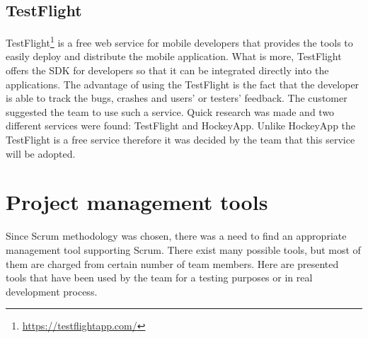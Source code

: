 \subsection{TestFlight}
\label{subsec:testflight}
TestFlight\footnote{\url{https://testflightapp.com/}} is a free web service for mobile developers that provides the tools to easily deploy and distribute the mobile application. 
What is more, TestFlight offers the SDK for developers so that it can be integrated directly into the applications. 
The advantage of using the TestFlight is the fact that the developer is able to track the bugs, crashes and users' or testers' feedback. 
The customer suggested the team to use such a service.
Quick research was made and two different services were found: TestFlight and HockeyApp. Unlike HockeyApp the TestFlight is a free service therefore it was decided by the team that this service will be adopted.


\section{Project management tools}
\label{sec:management_tools}
Since Scrum methodology was chosen, there was a need to find an appropriate management tool supporting Scrum.
There exist many possible tools, but most of them are charged from
certain number of team members. 
Here are presented tools that have been used by the team for a testing purposes or in real development process.


